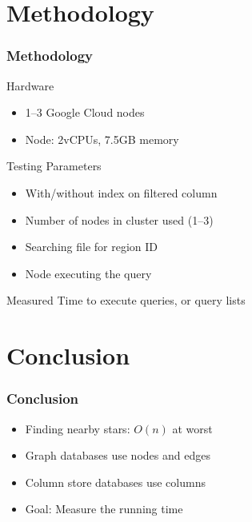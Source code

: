 \documentclass[11pt]{beamer}
\begin{document}
    \section{Methodology}\label{sec:methodology}
    \begin{frame}
        \frametitle{Methodology}
        \begin{block}{Hardware}
            \begin{itemize}
                \item 1--3 Google Cloud nodes
                \item Node: 2vCPUs, 7.5GB memory
            \end{itemize}
        \end{block}
        \begin{block}{Testing Parameters}
            \begin{itemize}
                \item With/without index on filtered column 
                \item Number of nodes in cluster used (1--3)
                \item Searching file for region ID
                \item Node executing the query
            \end{itemize}
        \end{block}
        \begin{block}{Measured}
            Time to execute queries, or query lists
        \end{block}
    \end{frame}

    \section{Conclusion}\label{sec:conclusion}
    \begin{frame}
        \frametitle{Conclusion}
        \begin{itemize}
            \item Finding nearby stars: $O(n)$ at worst \bigskip
            \item Graph databases use nodes and edges \bigskip
            \item Column store databases use columns \bigskip
            \item Goal: Measure the running time
        \end{itemize}
    \end{frame}

    \begin{frame}
    \end{frame}
\end{document}
